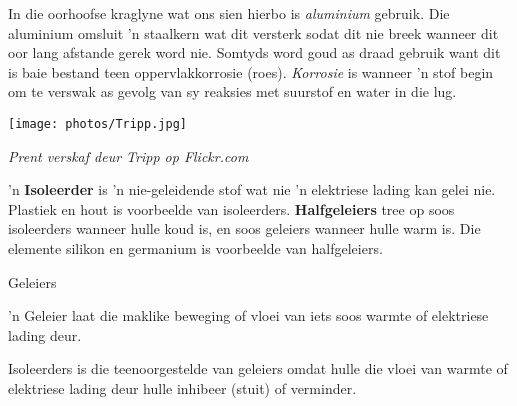 \begin{minipage}{0.5\textwidth}In die oorhoofse kraglyne wat ons sien hierbo
is \textsl{aluminium} gebruik. Die aluminium omsluit  'n staalkern wat dit versterk sodat dit nie breek wanneer dit oor lang afstande gerek word nie. Somtyds word goud as draad gebruik want dit is baie bestand teen oppervlakkorrosie (roes). \textsl{Korrosie} is wanneer 'n stof begin om te verswak as gevolg van sy reaksies met suurstof en water in die lug.\par 
\end{minipage}
\begin{minipage}{.5\textwidth}
\begin{center}
 \texttt{[image: photos/Tripp.jpg]}\par
\textit{Prent verskaf deur Tripp op Flickr.com}
\end{center}
\end{minipage}
      \label{m38706*id66098} 'n \textbf{Isoleerder} is 'n nie-geleidende stof wat nie 'n elektriese lading kan gelei nie. Plastiek en hout is voorbeelde van isoleerders. \textbf{Halfgeleiers} tree op soos isoleerders wanneer hulle koud is, en soos geleiers wanneer hulle warm is. Die elemente silikon en germanium is voorbeelde van halfgeleiers.\par 
\Definition
{Geleiers} 
{ 'n Geleier laat die maklike beweging of vloei van iets soos warmte of elektriese lading deur.\par 
       } 
{Isoleerders is die teenoorgestelde van geleiers omdat hulle die vloei van warmte of elektriese lading deur hulle inhibeer (stuit) of verminder.\par}

